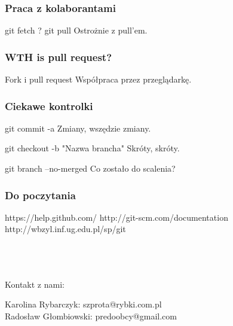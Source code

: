 \documentclass[9pt]{beamer}
\begin{document}
		
	\begin{frame}
		\frametitle{Praca z kolaborantami}

			\begin{block}{git fetch ? git pull}
				Ostrożnie z pull'em.
			\end{block}
					
						
	\end{frame}
	
		
	\begin{frame}
		\frametitle{WTH is pull request?}

			\begin{block}{Fork i pull request}
				Współpraca przez przeglądarkę.
			\end{block}								
						
	\end{frame}
	
		
	\begin{frame}
		\frametitle{Ciekawe kontrolki}

			\begin{block}{git commit -a}
				Zmiany, wszędzie zmiany.
			\end{block}

			\begin{block}{git checkout -b "Nazwa brancha"}
				Skróty, skróty.
			\end{block}	

			\begin{block}{git branch --no-merged}
				Co zostało do scalenia?
			\end{block}	
								
						
	\end{frame}



	
	\begin{frame}
	\frametitle{Do poczytania}
	\footnotesize{
	\begin{thebibliography}{99} %
	 https://help.github.com/
	 http://git-scm.com/documentation
	 http://wbzyl.inf.ug.edu.pl/sp/git

	\end{thebibliography}
	}
	
	\begin{block}{\\~\\~\\Kontakt z nami:}
	
	Karolina Rybarczyk: szprota@rybki.com.pl \\
	Radosław Głombiowski: predoobcy@gmail.com

    \end{block}
	
	
	\end{frame}
\end{document}
